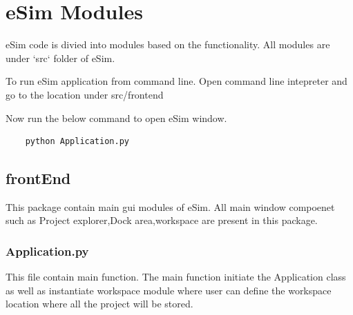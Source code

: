 \documentclass[12pt]{article}
\begin{document}
\newpage

\section{eSim Modules}

eSim code is divied into modules based on the functionality. All modules are under `src` folder of eSim.

To run eSim application from command line. Open command line intepreter and go to the location under src/frontend

Now run the below command to open eSim window.

\begin{lstlisting}
	python Application.py 			
\end{lstlisting}

\subsection{frontEnd}
This package contain main gui modules of eSim. All main window compoenet such as Project explorer,Dock area,workspace are present in this package.

\subsubsection{Application.py}
This file contain main function. The main function initiate the Application class as well as instantiate workspace module where user can define the workspace location where all the project will be stored.
\end{document}
